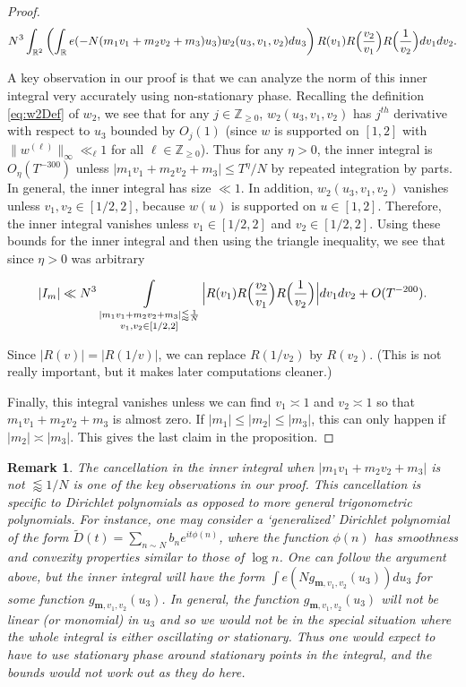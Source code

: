 \documentclass{amsart}
\theoremstyle{plain}
\newtheorem*{rmk}{Remark}
\numberwithin{equation}{section}
\renewcommand{\tilde}{\widetilde}
\begin{document}
\begin{proof}
\[
N^3 \int_{\mathbb{R}^2} \left(  \int_{\mathbb{R}} e(-N (m_1 v_1+ m_2 v_2+m_3)u_3)w_2(u_3,v_1,v_2) du_3 \right) R(v_1)R\Bigl(\frac{v_2}{v_1}\Bigr)R\Bigl(\frac{1}{v_2}\Bigr) dv_1 dv_2.
\]

A key observation in our proof is that we can analyze the norm of this inner integral very accurately using non-stationary phase. Recalling the definition \eqref{eq:w2Def} of $w_2$, we see that for any $j\in \mathbb{Z}_{\ge 0}$, $w_2(u_3,v_1,v_2)$ has $j^{th}$ derivative with respect to $u_3$ bounded by $O_j(1)$ (since $w$ is supported on $[1,2]$ with $\|w^{(\ell)}\|_\infty \ll_\ell 1$ for all $\ell\in \mathbb{Z}_{\ge 0}$). Thus for any $\eta>0$, the inner integral is $O_\eta(T^{-300})$ unless $|m_1 v_1+m_2 v_2+m_3| \le T^\eta/N$ by repeated integration by parts.   In general,  the inner integral has size $\ll 1$.   
In addition, $w_2(u_3,v_1,v_2)$ vanishes unless $v_1, v_2 \in [1/2,2]$, because $w(u)$ is supported on $u\in [1,2]$.   Therefore, the inner integral vanishes unless $v_1 \in[1/2,2]$ and $v_2 \in[1/2,2]$.  Using these bounds for the inner integral and then using the triangle inequality, we see that since $\eta>0$ was arbitrary

\[
|I_m| \ll N^3  \mathop{\int}_{\substack{|m_1 v_1 + m_2 v_2 + m_3| \lessapprox \frac{1}{N}\\ v_1, v_2 \in[1/2,2]}}  \Big| R(v_1)R\Bigl(\frac{v_2}{v_1}\Bigr)R\Bigl(\frac{1}{v_2}\Bigr) \Big| dv_1 dv_2+O(T^{-200}).
\]

Since $|R(v)| = |R(1/v)|$,  we can replace $R(1/v_2)$ by $R(v_2)$.   (This is not really important, but it makes later computations cleaner.)

Finally,  this integral vanishes unless we can find $v_1 \asymp 1$ and $v_2 \asymp 1$ so that $m_1 v_1 + m_2 v_2 + m_3$ is almost zero.  If $|m_1| \le |m_2| \le |m_3|$, this can only happen if $|m_2| \asymp |m_3|$.  This gives the last claim in the proposition. 
\end{proof}

%
%

\begin{rmk}
The cancellation in the inner integral when $|m_1 v_1 + m_2 v_2 + m_3|$ is not $\lessapprox 1/N$ is one of the key observations in our proof.    This cancellation is specific to Dirichlet polynomials as opposed to more general trigonometric polynomials.  For instance, one may consider a `generalized' Dirichlet polynomial of the form $\tilde{D}(t) = \sum_{n \sim N} b_n e^{i t \phi(n)}$, where the function $\phi(n)$ has smoothness and convexity properties similar to those of $\log n$.  One can follow the argument above, but the inner integral will have the form $\int e( N g_{\mathbf{m}, v_1, v_2}(u_3)) du_3$ for some function $g_{\mathbf{m}, v_1, v_2}(u_3)$.  In general, the function $g_{\mathbf{m}, v_1, v_2}(u_3)$ will not be linear (or monomial) in $u_3$ and so we would not be in the special situation where the whole integral is either oscillating or stationary.  Thus one would expect to have to use stationary phase around stationary points in the integral, and the bounds would not work out as they do here.
\end{rmk}
\end{document}
